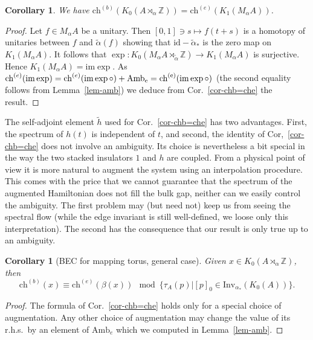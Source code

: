 \documentclass[11pt]{amsart}
\newtheorem{coro}[theorem]{Corollary}
\newcommand{\Z}{\mathbb{Z}}
\newcommand{\chb}{\text{ch}^{(b)}}
\newcommand{\che}{\text{ch}^{(e)}}
\begin{document}
\begin{coro}\label{cor-B=J}
We have $\chb(K_0(A\rtimes_\alpha\Z)) = \che(K_1(M_\alpha A))$.
\end{coro}
\begin{proof}
Let $f\in M_\alpha A$ be a unitary. Then $[0,1]\ni s\mapsto f(t+s)$ is a homotopy of unitaries between $f$ and $\tilde\alpha(f)$ showing that $\mathrm{id}-\tilde\alpha_*$ is the zero map on $K_1(M_\alpha A)$. It follows that $\exp:K_0(M_\alpha A\rtimes_{\tilde\alpha}\Z) \to K_1(M_\alpha A)$ is surjective. Hence $K_1(M_\alpha A)=\mathrm{im}\exp$. 
As $\che(\mathrm{im}\exp)=\che(\mathrm{im}\exp \circ \sc) + \mathrm{Amb}_e = \che(\mathrm{im}\exp \circ \sc)$ (the second equality follows from Lemma~\ref{lem-amb}) we deduce from Cor.~\ref{cor-chb=che} the result.
\end{proof}

The self-adjoint element $\tilde h$ used for Cor.~\ref{cor-chb=che} has two advantages. First, the spectrum of $h(t)$ is independent of $t$, and second, the identity of Cor,~\ref{cor-chb=che} does not involve an ambiguity. Its choice is nevertheless a bit special in the way the two stacked insulators $1$ and $h$ are coupled. From a physical point of view it is more natural to augment the system using an interpolation procedure. This comes with the price that we cannot guarantee that the spectrum of the augmented Hamiltonian does not fill the bulk gap, neither can we easily control the ambiguity. The first problem may (but need not) keep us from seeing the spectral flow (while the edge invariant is still well-defined, we loose only this interpretation). The second has the consequence that our result is only true up to an ambiguity. 
\begin{coro}[BEC for mapping torus, general case]\label{BBC_mapping_torus}
	Given $x\in K_0(A \rtimes_\alpha \mathbb{Z})$, then
	$$\chb(x)\equiv \che(\beta(x))
	\mod{	\{\tau_A(p)|[p]_0\in \mathrm{Inv}_{\alpha_*} (K_0(A))\}}.$$
\end{coro}
\begin{proof} The formula of Cor.~\ref{cor-chb=che} holds only for a special choice of augmentation. Any other choice of augmentation may change the value of its r.h.s.\ by an element of $\mathrm{Amb}_e$ which we computed in Lemma~\ref{lem-amb}.
\end{proof}
\end{document}
